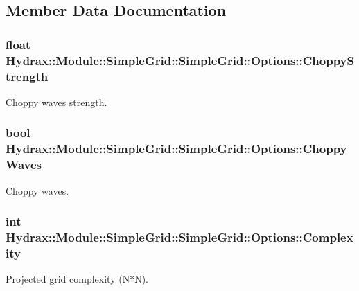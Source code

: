 \subsection{Member Data Documentation}
\hypertarget{struct_hydrax_1_1_module_1_1_simple_grid_1_1_options_2eda0cfbbe201148b3f3287ce4a91055}{
\subsubsection[{ChoppyStrength}]{\setlength{\rightskip}{0pt plus 5cm}float Hydrax::Module::SimpleGrid::SimpleGrid::Options::ChoppyStrength}}
\label{struct_hydrax_1_1_module_1_1_simple_grid_1_1_options_2eda0cfbbe201148b3f3287ce4a91055}


Choppy waves strength. 

\hypertarget{struct_hydrax_1_1_module_1_1_simple_grid_1_1_options_9cd5aefce26c64d689ee441431d47cc9}{
\subsubsection[{ChoppyWaves}]{\setlength{\rightskip}{0pt plus 5cm}bool Hydrax::Module::SimpleGrid::SimpleGrid::Options::ChoppyWaves}}
\label{struct_hydrax_1_1_module_1_1_simple_grid_1_1_options_9cd5aefce26c64d689ee441431d47cc9}


Choppy waves. 

\hypertarget{struct_hydrax_1_1_module_1_1_simple_grid_1_1_options_3ccaa20a5351a3bd3e743f179a347e4f}{
\subsubsection[{Complexity}]{\setlength{\rightskip}{0pt plus 5cm}int Hydrax::Module::SimpleGrid::SimpleGrid::Options::Complexity}}
\label{struct_hydrax_1_1_module_1_1_simple_grid_1_1_options_3ccaa20a5351a3bd3e743f179a347e4f}


Projected grid complexity (N$\ast$N). 

